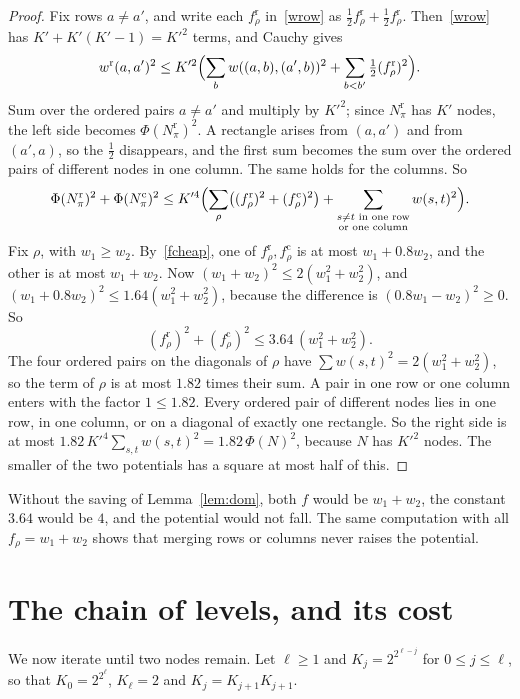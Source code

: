 \documentclass[11pt]{article}
\begin{document}
\begin{proof}
Fix rows $a\ne a'$, and write each $f^{\mathrm r}_\rho$ in~\eqref{wrow} as $\frac12f^{\mathrm r}_\rho+\frac12f^{\mathrm r}_\rho$. Then~\eqref{wrow} has $K'+K'(K'-1)=K'^2$ terms, and Cauchy gives
\[
w^{\mathrm r}(a,a')^2\le K'^2\Bigl(\sum_bw((a,b),(a',b))^2+\sum_{b<b'}\tfrac12(f^{\mathrm r}_\rho)^2\Bigr).
\]
Sum over the ordered pairs $a\ne a'$ and multiply by $K'^2$; since $N^{\mathrm r}_\pi$ has $K'$ nodes, the left side becomes $\Phi(N^{\mathrm r}_\pi)^2$. A rectangle arises from $(a,a')$ and from $(a',a)$, so the $\frac12$ disappears, and the first sum becomes the sum over the ordered pairs of different nodes in one column. The same holds for the columns. So
\[
\Phi(N^{\mathrm r}_\pi)^2+\Phi(N^{\mathrm c}_\pi)^2\le K'^4\Bigl(\sum_\rho\bigl((f^{\mathrm r}_\rho)^2+(f^{\mathrm c}_\rho)^2\bigr)+\sum_{\substack{s\ne t\text{ in one row}\\\text{or one column}}}w(s,t)^2\Bigr).
\]
Fix $\rho$, with $w_1\ge w_2$. By~\eqref{fcheap}, one of $f^{\mathrm r}_\rho,f^{\mathrm c}_\rho$ is at most $w_1+0.8w_2$, and the other is at most $w_1+w_2$. Now $(w_1+w_2)^2\le2(w_1^2+w_2^2)$, and $(w_1+0.8w_2)^2\le1.64(w_1^2+w_2^2)$, because the difference is $(0.8w_1-w_2)^2\ge0$. So
\[
(f^{\mathrm r}_\rho)^2+(f^{\mathrm c}_\rho)^2\le3.64\,(w_1^2+w_2^2).
\]
The four ordered pairs on the diagonals of $\rho$ have $\sum w(s,t)^2=2(w_1^2+w_2^2)$, so the term of $\rho$ is at most $1.82$ times their sum. A pair in one row or one column enters with the factor $1\le1.82$. Every ordered pair of different nodes lies in one row, in one column, or on a diagonal of exactly one rectangle. So the right side is at most $1.82\,K'^4\sum_{s,t}w(s,t)^2=1.82\,\Phi(N)^2$, because $N$ has $K'^2$ nodes. The smaller of the two potentials has a square at most half of this.
\end{proof}

Without the saving of Lemma~\ref{lem:dom}, both $f$ would be $w_1+w_2$, the constant $3.64$ would be $4$, and the potential would not fall. The same computation with all $f_\rho=w_1+w_2$ shows that merging rows or columns never raises the potential.

\section{The chain of levels, and its cost}\label{sec:chain}

We now iterate until two nodes remain. Let $\ell\ge1$ and $K_j=2^{2^{\ell-j}}$ for $0\le j\le\ell$, so that $K_0=2^{2^\ell}$, $K_\ell=2$ and $K_j=K_{j+1}K_{j+1}$.
\end{document}

